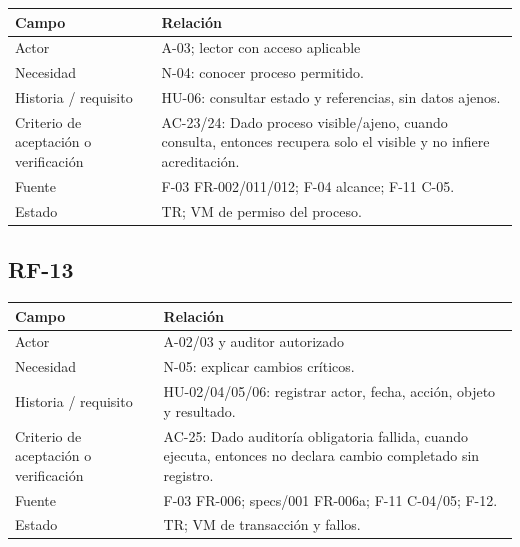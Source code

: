 \documentclass[12pt,a4paper]{report}
\begin{document}
{\def\LTcaptype{none} %
\begin{longtable}[]{@{}
  >{\raggedright\arraybackslash}p{}
  >{\raggedright\arraybackslash}p{}@{}}
\toprule\noalign{}
\begin{minipage}[b]{\linewidth}\raggedright
Campo
\end{minipage} & \begin{minipage}[b]{\linewidth}\raggedright
Relación
\end{minipage} \\
\midrule\noalign{}
\endhead
\bottomrule\noalign{}
\endlastfoot
Actor & A-03; lector con acceso aplicable \\
Necesidad & N-04: conocer proceso permitido. \\
Historia / requisito & HU-06: consultar estado y referencias, sin
datos ajenos. \\
Criterio de aceptación o verificación & AC-23/24: Dado proceso
visible/ajeno, cuando consulta, entonces recupera solo el visible y no
infiere acreditación. \\
Fuente & F-03 FR-002/011/012; F-04 alcance; F-11 C-05. \\
Estado & TR; VM de permiso del proceso. \\
\end{longtable}
}

\subsection{RF-13}\label{matriz-RF-13}

{\def\LTcaptype{none} %
\begin{longtable}[]{@{}
  >{\raggedright\arraybackslash}p{}
  >{\raggedright\arraybackslash}p{}@{}}
\toprule\noalign{}
\begin{minipage}[b]{\linewidth}\raggedright
Campo
\end{minipage} & \begin{minipage}[b]{\linewidth}\raggedright
Relación
\end{minipage} \\
\midrule\noalign{}
\endhead
\bottomrule\noalign{}
\endlastfoot
Actor & A-02/03 y auditor autorizado \\
Necesidad & N-05: explicar cambios críticos. \\
Historia / requisito & HU-02/04/05/06: registrar actor, fecha,
acción, objeto y resultado. \\
Criterio de aceptación o verificación & AC-25: Dado auditoría
obligatoria fallida, cuando ejecuta, entonces no declara cambio
completado sin registro. \\
Fuente & F-03 FR-006; specs/001 FR-006a; F-11 C-04/05; F-12. \\
Estado & TR; VM de transacción y fallos. \\
\end{longtable}
}
\end{document}
